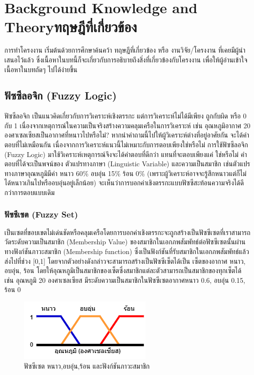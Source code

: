 \chapter{\ifenglish Background Knowledge and Theory\else ทฤษฎีที่เกี่ยวข้อง\fi}

การทำโครงงาน เริ่มต้นด้วยการศึกษาค้นคว้า ทฤษฎีที่เกี่ยวข้อง หรือ งานวิจัย/โครงงาน ที่เคยมีผู้นำเสนอไว้แล้ว ซึ่งเนื้อหาในบทนี้ก็จะเกี่ยวกับการอธิบายถึงสิ่งที่เกี่ยวข้องกับโครงงาน เพื่อให้ผู้อ่านเข้าใจเนื้อหาในบทถัดๆ ไปได้ง่ายขึ้น

\section{ฟัซซีลอจิก (Fuzzy Logic)}
ฟัซซีลอจิก เป็นแนวคิดเกี่ยวกับการวิเคราะห์เชิงตรรกะ แต่การวิเคราะห์ไม่ได้มีเพียง ถูกกับผิด หรือ 0 กับ 1 เนื่องจากเหตุการณ์ในความเป็นจริงสร้างความคลุมเครือในการวิเคราะห์ เช่น อุณหภูมิอากาศ 20 องศาเซลเซียสเป็นอากาศที่หนาวไปหรือไม่? หากนำคำถามนี้ไปให้ผู้วิเคราะห์ต่างที่อยู่อาศัยกัน จะได้คำตอบที่ไม่เหมือนกัน เนื่องจากการวิเคราะห์แนวนี้ไม่เหมาะกับการตอบเพียงใช่หรือไม่ การใช้ฟัซซีลอจิก (Fuzzy Logic) มาใช้วิเคราะห์เหตุการณ์จึงจะได้คำตอบที่ดีกว่า แทนที่จะตอบเพียงแค่ ใช่หรือไม่ คำตอบที่ได้จะเป็นพจน์ของ ตัวแปรทางภาษา (Linguistic Variable) และความเป็นสมาชิก เช่นตัวแปรทางภาษาอุณหภูมิมีค่า หนาว 60\% อบอุ่น 15\% ร้อน 0\% (เพราะผู้วิเคราะห์อาจจะรู้สึกหนาวแต่ก็ไม่ได้หนาวเกินไปหรืออบอุ่นอยู่เล็กน้อย) จะเห็นว่าการบอกค่าเชิงตรรกะแบบฟัซซีสะท้อนความจริงได้ดีกว่าการตอบแบบเดิม


\subsection{ฟัซซีเซต (Fuzzy Set)}
เป็นเซตที่ขอบเขตไม่เด่นชัดหรือคลุมเครือโดยการบอกค่าเชิงตรรกะจะถูกสร้างเป็นฟัซซีเซตที่เราสามารถวัดระดับความเป็นสมาชิก (Membership Value) ของสมาชิกในเอกภพสัมพัทธ์ต่อฟัซซีเซตนั้นผ่านทางฟังก์ชันภาวะสมาชิก (Membership function) ซึ่งเป็นฟังก์ชันที่รับสมาชิกในเอกภพสัมพัทธ์แล้วส่งไปที่ช่วง [0,1] โดยจากตัวอย่างดังกล่าวจะสามารถสร้างเป็นฟัซซีเซ็ตได้เป็น เซ็ตของอากาศ หนาว, อบอุ่น, ร้อน โดยให้อุณหภูมิเป็นสมาชิกของเซ็ตซึ่งสมาชิกแต่ละตัวสามารถเป็นสมาชิกของทุกเซ็ตได้ เช่น อุณหภูมิ 20 องศาเซลเซียส มีระดับความเป็นสมาชิกในฟัซซีเซตอากาศหนาว 0.6, อบอุ่น 0.15, ร้อน 0
\begin{figure}[ht]
    \centering
    \includegraphics[scale=0.7]{images/fuzzy_set.png}
    \caption{ฟัซซีเซต หนาว,อบอุ่น,ร้อน และฟังก์ชันภาวะสมาชิก}
    \label{fig:1}
\end{figure}


